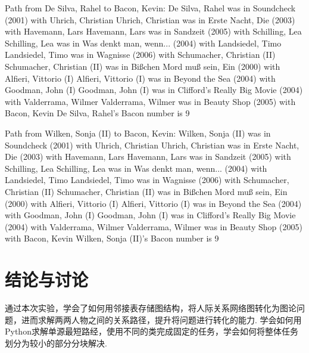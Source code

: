 \documentclass[12pt, a4paper, oneside]{ctexart}
\numberwithin{equation}{section}  %
\begin{document}
\begin{pythoncode}
Path from De Silva, Rahel to Bacon, Kevin:
De Silva, Rahel was in Soundcheck (2001) with Uhrich, Christian
Uhrich, Christian was in Erste Nacht, Die (2003) with Havemann, Lars
Havemann, Lars was in Sandzeit (2005) with Schilling, Lea
Schilling, Lea was in Was denkt man, wenn... (2004) with Landsiedel, Timo
Landsiedel, Timo was in Wagnisse (2006) with Schumacher, Christian (II)
Schumacher, Christian (II) was in Bißchen Mord muß sein, Ein (2000) with Alfieri, Vittorio (I)
Alfieri, Vittorio (I) was in Beyond the Sea (2004) with Goodman, John (I)
Goodman, John (I) was in Clifford's Really Big Movie (2004) with Valderrama, Wilmer
Valderrama, Wilmer was in Beauty Shop (2005) with Bacon, Kevin
De Silva, Rahel's Bacon number is 9


Path from Wilken, Sonja (II) to Bacon, Kevin:
Wilken, Sonja (II) was in Soundcheck (2001) with Uhrich, Christian
Uhrich, Christian was in Erste Nacht, Die (2003) with Havemann, Lars
Havemann, Lars was in Sandzeit (2005) with Schilling, Lea
Schilling, Lea was in Was denkt man, wenn... (2004) with Landsiedel, Timo
Landsiedel, Timo was in Wagnisse (2006) with Schumacher, Christian (II)
Schumacher, Christian (II) was in Bißchen Mord muß sein, Ein (2000) with Alfieri, Vittorio (I)
Alfieri, Vittorio (I) was in Beyond the Sea (2004) with Goodman, John (I)
Goodman, John (I) was in Clifford's Really Big Movie (2004) with Valderrama, Wilmer
Valderrama, Wilmer was in Beauty Shop (2005) with Bacon, Kevin
Wilken, Sonja (II)'s Bacon number is 9
\end{pythoncode}

\section{结论与讨论}
通过本次实验，学会了如何用邻接表存储图结构，将人际关系网络图转化为图论问题，进而求解两两人物之间的关系路径，提升将问题进行转化的能力. 学会如何用Python求解单源最短路经，使用不同的类完成固定的任务，学会如何将整体任务划分为较小的部分分块解决.
\end{document}
